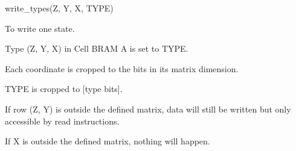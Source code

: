 

\format
write\_types(Z, Y, X, TYPE)

\purpose

To write one state.

\description

Type (Z, Y, X) in Cell BRAM A is set to TYPE.

\notes

Each coordinate is cropped to the bits in its matrix dimension.

TYPE is cropped to [type bits].

If row (Z, Y) is outside the defined matrix, data will still be written but only accessible by read instructions.

If X is outside the defined matrix, nothing will happen.
